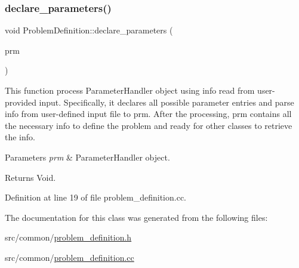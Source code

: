 \subsubsection{\texorpdfstring{declare\+\_\+parameters()}{declare\_parameters()}}
{\footnotesize\ttfamily void Problem\+Definition\+::declare\+\_\+parameters (\begin{DoxyParamCaption}\item[{Parameter\+Handler \&}]{prm }\end{DoxyParamCaption})\hspace{0.3cm}{\ttfamily [static]}}

This function process Parameter\+Handler object using info read from user-\/provided input. Specifically, it declares all possible parameter entries and parse info from user-\/defined input file to prm. After the processing, prm contains all the necessary info to define the problem and ready for other classes to retrieve the info.


\begin{DoxyParams}{Parameters}
{\em prm} & Parameter\+Handler object. \\
\hline
\end{DoxyParams}
\begin{DoxyReturn}{Returns}
Void. 
\end{DoxyReturn}


Definition at line 19 of file problem\+\_\+definition.\+cc.



The documentation for this class was generated from the following files\+:\begin{DoxyCompactItemize}
\item 
src/common/\hyperlink{problem__definition_8h}{problem\+\_\+definition.\+h}\item 
src/common/\hyperlink{problem__definition_8cc}{problem\+\_\+definition.\+cc}\end{DoxyCompactItemize}
